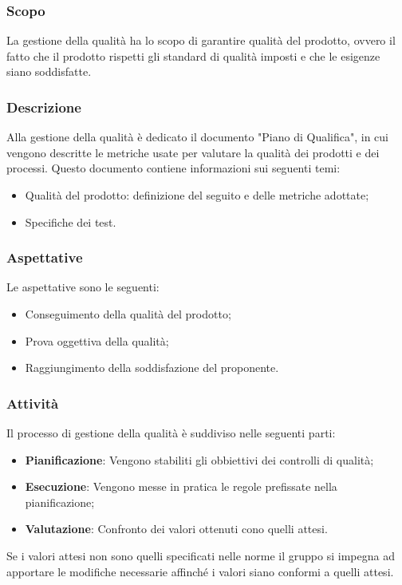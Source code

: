 \documentclass[../norme_di_progetto.tex]{subfiles}
\begin{document}
\subsubsection{Scopo}
La gestione della qualità ha lo scopo di garantire qualità del prodotto, ovvero il fatto che il prodotto rispetti gli standard di qualità imposti e che le esigenze siano soddisfatte.

\subsubsection{Descrizione}
Alla gestione della qualità è dedicato il documento "Piano di Qualifica", in cui vengono descritte le metriche usate per valutare la qualità dei prodotti e dei processi. Questo documento contiene informazioni sui seguenti temi:
\begin{itemize}
    \item Qualità del prodotto: definizione del  seguito e delle metriche adottate;
    \item Specifiche dei test.
\end{itemize}

\subsubsection{Aspettative}
Le aspettative sono le seguenti:
\begin{itemize}
    \item Conseguimento della qualità del prodotto;
    \item Prova oggettiva della qualità;
    \item Raggiungimento della soddisfazione del proponente.
\end{itemize}

\subsubsection{Attività}
Il processo di gestione della qualità è suddiviso nelle seguenti parti:
\begin{itemize}
    \item \textbf{Pianificazione}: Vengono stabiliti gli obbiettivi dei controlli di qualità;
    \item \textbf{Esecuzione}: Vengono messe in pratica le regole prefissate nella pianificazione;
    \item \textbf{Valutazione}: Confronto dei valori ottenuti cono quelli attesi.
\end{itemize}
Se i valori attesi non sono quelli specificati nelle norme il gruppo si impegna ad apportare le modifiche necessarie affinché i valori siano conformi a quelli attesi.
\end{document}
